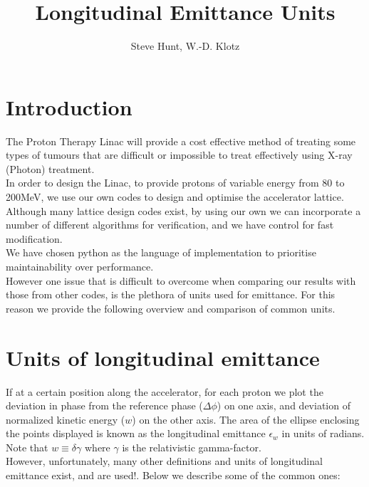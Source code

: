 \documentclass{article}
\title{Longitudinal Emittance Units}
\author{Steve Hunt, W.-D. Klotz}
\begin{document}
\maketitle

\section{Introduction}
The Proton Therapy Linac will provide a cost effective method of treating some types of tumours that are difficult or impossible to treat effectively using X-ray (Photon) treatment.  \\

In order to design the Linac, to provide protons of variable energy from 80 to 200MeV, we use our own codes to design and optimise the accelerator lattice. Although many lattice design codes exist, by using our own we can incorporate a number of different algorithms for verification, and we have control for fast modification.\\

We have chosen python as the language of implementation to prioritise maintainability over performance.\\

However one issue that is difficult to overcome when comparing our results with those from other codes, is the plethora of units used for emittance.  For this reason we provide the following overview and comparison of common units.\\

\section{Units of longitudinal emittance}

If at a certain position along the accelerator, for each proton we plot the deviation in phase from the reference phase ($ \Delta\phi $) on one axis, and deviation of normalized kinetic energy ($w$) on the other axis. The area of the ellipse enclosing the points displayed is known as the longitudinal emittance $\epsilon_{w}$ in units of radians. Note that $w \equiv \delta\gamma$ where $\gamma$ is the relativistic gamma-factor.  \\

However, unfortunately, many other definitions and units of longitudinal emittance exist, and are used!. Below we describe some of the common ones: \\
\end{document}
